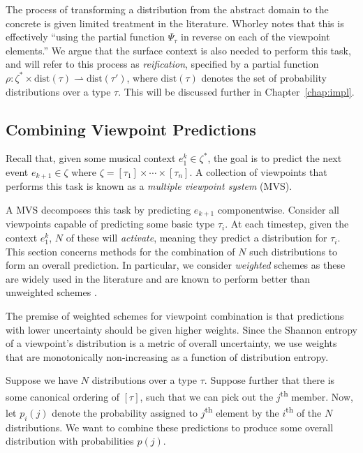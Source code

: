 \documentclass[12pt,a4paper,twoside,openright]{report}
\begin{document}
The process of transforming a distribution from the abstract domain to the
concrete is given limited treatment in the literature. Whorley
\cite{whorley2013phd} notes that this is effectively ``using the partial
function $\Psi_\tau$ in reverse on each of the viewpoint elements.'' We argue
that the surface context is also needed to perform this task, and will refer to
this process as \emph{reification}, specified by a partial function $\rho :
\zeta^* \times \mathrm{dist}(\tau) \rightharpoonup \mathrm{dist}(\tau')$, where
$\mathrm{dist}(\tau)$ denotes the set of probability distributions over a type
$\tau$. This will be discussed further in Chapter~\ref{chap:impl}.

\subsection{Combining Viewpoint Predictions}\label{sec:vp-comb}

Recall that, given some musical context $e_1^k \in \zeta^*$, the goal is to
predict the next event $e_{k+1} \in \zeta$ where $\zeta = [\tau_1] \times \cdots
\times [\tau_n]$.  A collection of viewpoints that performs this task is known
as a \emph{multiple viewpoint system} (MVS). 

A MVS decomposes this task by predicting $e_{k+1}$ componentwise. Consider all
viewpoints capable of predicting some basic type $\tau_i$. At each timestep,
given the context $e_1^k$, $N$ of these will \emph{activate}, meaning they
predict a distribution for $\tau_i$. This section concerns methods for the
combination of $N$ such distributions to form an overall prediction. In
particular, we consider \emph{weighted} schemes as these are widely used in the
literature and are known to perform better than unweighted schemes
\cite{pearce2004combining}.

The premise of weighted schemes for viewpoint combination is that predictions
with lower uncertainty should be given higher weights.  Since the Shannon
entropy of a viewpoint's distribution is a metric of overall uncertainty, we use
weights that are monotonically non-increasing as a function of distribution
entropy.

Suppose we have $N$ distributions over a type $\tau$. Suppose further that there
is some canonical ordering of $[\tau]$, such that we can pick out the
$j$\textsuperscript{th} member. Now, let $p_i(j)$ denote the probability
assigned to $j$\textsuperscript{th} element by the $i$\textsuperscript{th} of the
$N$ distributions. We want to combine these predictions to produce some overall
distribution with
probabilities $p(j)$.
\end{document}
